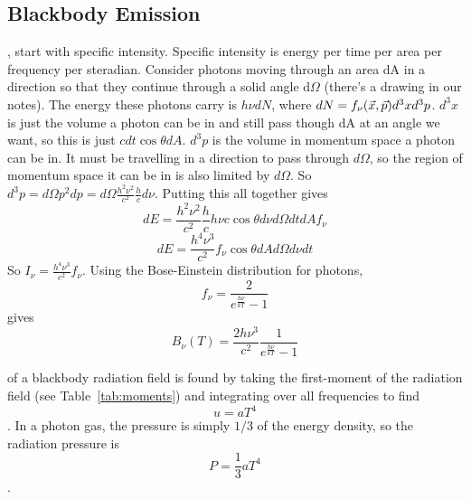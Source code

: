 \subsection{Blackbody Emission}
,
start with specific intensity.  Specific intensity is energy per time per area per frequency per 
steradian.  Consider photons moving through an area dA in a direction so that they continue 
through a solid angle d$\Omega$ (there's a drawing in our notes).  The energy these photons carry 
is $h\nu dN$, where $dN=f_{\nu}(\vec{x},\vec{p})d^3xd^3p$.  $d^3x$ is just the volume a photon can be in 
and still pass though dA at an angle we want, so this is just $cdt\cos{\theta}dA$.  $d^3p$ is the 
volume in momentum space a photon can be in.  It must be travelling in a direction to pass through 
$d\Omega$, so the region of momentum space it can be in is also limited by $d\Omega$.  So 
$d^3p=d\Omega p^2dp=d\Omega \frac{h^2\nu^2}{c^2}\frac{h}{c}d\nu$.  Putting this all together gives 
\begin{displaymath}dE=\frac{h^2\nu^2}{c^2}\frac{h}{c}h\nu c\cos{\theta}d\nu d\Omega dtdAf_{\nu}\end{displaymath}
\begin{displaymath}dE=\frac{h^4\nu^3}{c^2}f_{\nu}\cos{\theta}dAd\Omega d\nu dt\end{displaymath}
So $I_{\nu}=\frac{h^4\nu^3}{c^2}f_{\nu}$.
Using the Bose-Einstein distribution for photons, 
\begin{displaymath}f_{\nu}=\frac{2}{e^{\frac{h\nu}{kT}}-1}\end{displaymath}
gives
\begin{dmath}\boxed{B_{\nu}(T)=\frac{2h\nu^3}{c^2}\frac{1}{e^{\frac{h\nu}{kT}}-1}}\end{dmath}

 of a blackbody radiation field is found by taking the
first-moment of the radiation field (see Table~\ref{tab:moments}) and integrating over
all frequencies to find
\begin{dmath}\boxed{u=aT^4}\end{dmath}.
In a photon gas, the pressure is simply $1/3$ of the energy density, so the radiation pressure is
\begin{dmath}\boxed{P=\frac{1}{3}aT^4}\end{dmath}.

